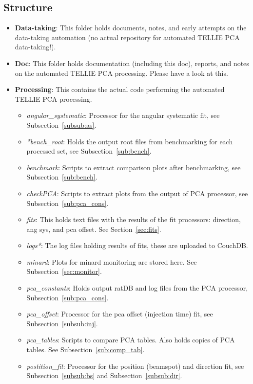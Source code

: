 \documentclass[12pt]{article}
\begin{document}
\subsection{Structure}\label{sub:struct}
\begin{itemize}
	\item \textbf{Data-taking}: This folder holds documents, notes, and early attempts on the data-taking automation (no actual repository for automated TELLIE PCA data-taking!).
	\item \textbf{Doc}: This folder holds documentation (including this doc), reports, and notes on the automated TELLIE PCA processing. Please have a look at this.
	\item \textbf{Processing}: This contains the actual code performing the automated TELLIE PCA processing.
	\begin{itemize}
		\item \textit{angular\_systematic}: Processor for the angular systematic fit, see Subsection~\ref{subsub:as}.
		\item \textit{*bench\_root}: Holds the output root files from benchmarking for each processed set, see Subsection~\ref{sub:bench}.
		\item \textit{benchmark}: Scripts to extract comparison plots after benchmarking, see Subsection~\ref{sub:bench}.
		\item \textit{checkPCA}: Scripts to extract plots from the output of PCA processor, see Subsection~\ref{sub:pca_cons}.
		\item \textit{fits}: This holds text files with the results of the fit processors: direction, ang sys, and pca offset. See Section~\ref{sec:fits}.
		\item \textit{logs*}: The log files holding results of fits, these are uploaded to CouchDB.
		\item \textit{minard}: Plots for minard monitoring are stored here. See Subsection~\ref{sec:monitor}.
		\item \textit{pca\_constants}: Holds output ratDB and log files from the PCA processor, Subsection~\ref{sub:pca_cons}.
		\item \textit{pca\_offset}: Processor for the pca offset (injection time) fit, see Subsection~\ref{subsub:inj}.
		\item \textit{pca\_tables}: Scripts to compare PCA tables. Also holds copies of PCA tables. See Subsection~\ref{sub:comp_tab}.
		\item \textit{postition\_fit}: Processor for the position (beamspot) and direction fit, see Subsection~\ref{subsub:bs} and Subsection~\ref{subsub:dir}.

\end{itemize}
\end{itemize}
\end{document}
